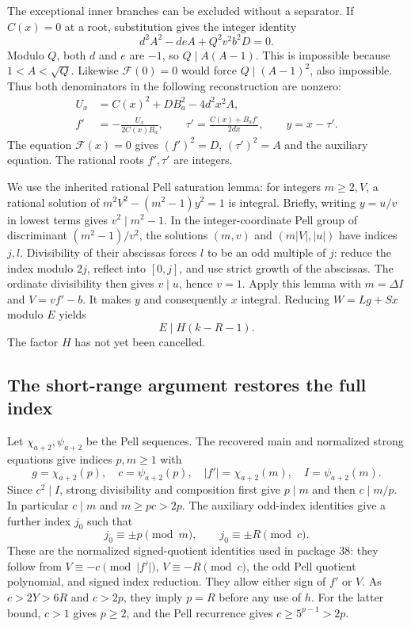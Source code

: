 The exceptional inner branches can be excluded without a separator.
If $C(x)=0$ at a root, substitution gives the integer identity
\[
 d^2A^2-deA+Q^2v^2b^2D=0.
\]
Modulo $Q$, both $d$ and $e$ are $-1$, so $Q\mid A(A-1)$.
This is impossible because $1<A<\sqrt Q$. Likewise
$\mathcal F(0)=0$ would force $Q\mid(A-1)^2$, also impossible.
Thus both denominators in the following reconstruction are nonzero:
\begin{align*}
 U_x&=C(x)^2+DB_a^2-4d^2x^2A,\\
 f'&=-\frac{U_x}{2C(x)B_a},\qquad
 \tau'=\frac{C(x)+B_af'}{2dx},\qquad y=x-\tau'.
\end{align*}
The equation $\mathcal F(x)=0$ gives $(f')^2=D$, $(\tau')^2=A$
and the auxiliary equation. The rational roots $f',\tau'$ are
integers.

We use the inherited rational Pell saturation lemma: for integers
$m\ge2,V$, a rational solution of
$m^2V^2-(m^2-1)y^2=1$ is integral. Briefly, writing $y=u/v$ in
lowest terms gives $v^2\mid m^2-1$. In the integer-coordinate Pell
group of discriminant $(m^2-1)/v^2$, the solutions $(m,v)$ and
$(m|V|,|u|)$ have indices $j,l$. Divisibility of their abscissas
forces $l$ to be an odd multiple of $j$: reduce the index modulo $2j$,
reflect into $[0,j]$, and use strict growth of the abscissas. The
ordinate divisibility then gives $v\mid u$, hence $v=1$.
Apply this lemma with $m=\Delta I$ and $V=vf'-b$. It makes $y$
and consequently $x$ integral. Reducing $W=Lg+Sx$ modulo $E$ yields
\begin{equation}\label{eq:eleven-weak-index}
 E\mid H(k-R-1).
\end{equation}
The factor $H$ has not yet been cancelled.

\subsection{The short-range argument restores the full index}

Let $\chi_{a+2},\psi_{a+2}$ be the Pell sequences. The recovered
main and normalized strong equations give indices $p,m\ge1$ with
\[
 g=\chi_{a+2}(p),\quad c=\psi_{a+2}(p),\quad
 |f'|=\chi_{a+2}(m),\quad I=\psi_{a+2}(m).
\]
Since $c^2\mid I$, strong divisibility and composition first give
$p\mid m$ and then $c\mid m/p$. In particular $c\mid m$ and
$m\ge pc>2p$. The auxiliary odd-index identities give a further
index $j_0$ such that
\[
 j_0\equiv\pm p\pmod m,\qquad j_0\equiv\pm R\pmod c.
\]
These are the normalized signed-quotient identities used in
package 38: they follow from $V\equiv-c\pmod{|f'|}$,
$V\equiv-R\pmod c$, the odd Pell quotient polynomial, and signed
index reduction. They allow either sign of $f'$ or $V$. As
$c>2Y>6R$ and $c>2p$, they imply $p=R$ before any use of $h$.
For the latter bound, $c>1$ gives $p\ge2$, and the Pell recurrence
gives $c\ge5^{p-1}>2p$.

